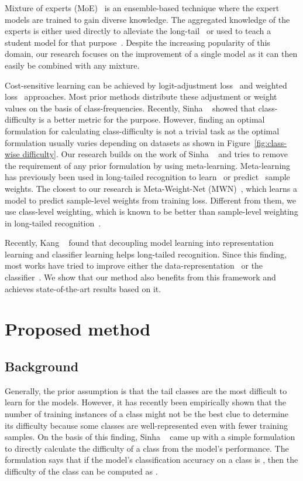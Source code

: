\documentclass[10pt,twocolumn,letterpaper]{article}
\newcommand{\sinha}[1]{{\color{black}#1}}
\begin{document}
Mixture of experts (MoE)~\cite{RIDE,LFME,TADE,bbn} is an ensemble-based technique where the expert models are trained to gain diverse knowledge. The aggregated knowledge of the experts is either used directly to alleviate the long-tail~\cite{RIDE,TADE} or used to teach a student model for that purpose~\cite{LFME}. 
Despite the increasing popularity of this domain, our research focuses on the improvement of a single 
model 
as
it can then easily be combined with any mixture.

Cost-sensitive learning can be achieved by logit-adjustment loss~\cite{ldam-drw,logitadjustment,seesawloss} and weighted loss~\cite{classbalancedloss,hardmining,focalloss,l2rw,meta-weight-net,eqllossv2,eqlloss} approaches. 
Most prior methods distribute these adjustment or weight values on the basis of class-frequencies. 
Recently, \sinha{Sinha \etal~\cite{cdb-ce,sinha_ijcv}} showed that class-difficulty is a better metric for the purpose. 
However, finding an optimal formulation for calculating class-difficulty is not a trivial task as the optimal formulation usually varies depending on datasets as shown in Figure~\ref{fig:class-wise difficulty}.
Our research builds on the work of Sinha \etal~\cite{cdb-ce} and tries to remove the requirement of any prior formulation by using meta-learning. Meta-learning~\cite{metalearning_1} has previously been used in long-tailed recognition to learn~\cite{jamal,l2rw} or predict~\cite{meta-weight-net} sample weights. The closest to our research is Meta-Weight-Net (MWN)~\cite{meta-weight-net}, which learns a model to predict sample-level weights from training loss. 
Different from them, we use class-level weighting, which is known to be better than sample-level weighting in long-tailed recognition~\cite{cdb-ce}.


Recently, Kang \etal~\cite{decoupling} found that decoupling model learning into representation learning and classifier learning helps long-tailed recognition. Since this finding, most works have tried to improve either the data-representation~\cite{dro-lt,ssl} or the classifier~\cite{groupsoftmax,classifierbalancing,disalign,mislas}. 
We show that our method also benefits from this framework and achieves state-of-the-art results based on it.

\section{Proposed method}
\subsection{Background}
Generally, the prior assumption is that the tail classes are the most difficult to learn for the models. However, it has recently been empirically shown that the number of training instances of a class might not be the best clue to determine its difficulty because some classes are well-represented even with fewer training samples. On the basis of this finding, Sinha \etal~\cite{cdb-ce} came up with a simple formulation to directly calculate the difficulty of a class from the model's performance. The formulation says that if the model's classification accuracy on a class  is , then the difficulty of the class  can be computed as .
\end{document}
